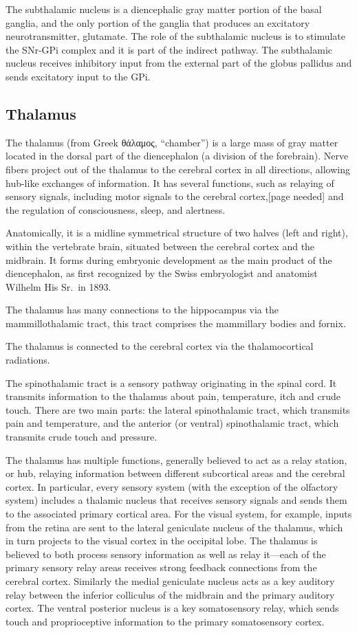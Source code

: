 The subthalamic nucleus is a diencephalic gray matter portion of the basal ganglia, and the only portion of the ganglia that produces an excitatory neurotransmitter, glutamate. The role of the subthalamic nucleus is to stimulate the SNr-GPi complex and it is part of the indirect pathway. The subthalamic nucleus receives inhibitory input from the external part of the globus pallidus and sends excitatory input to the GPi.

\hypertarget{thalamus}{%
\subsection{Thalamus}\label{thalamus}}

The thalamus (from Greek θάλαμος, ``chamber'') is a large mass of gray matter located in the dorsal part of the diencephalon (a division of the forebrain). Nerve fibers project out of the thalamus to the cerebral cortex in all directions, allowing hub-like exchanges of information. It has several functions, such as relaying of sensory signals, including motor signals to the cerebral cortex,{[}page needed{]} and the regulation of consciousness, sleep, and alertness.

Anatomically, it is a midline symmetrical structure of two halves (left and right), within the vertebrate brain, situated between the cerebral cortex and the midbrain. It forms during embryonic development as the main product of the diencephalon, as first recognized by the Swiss embryologist and anatomist Wilhelm His Sr.~in 1893.

The thalamus has many connections to the hippocampus via the mammillothalamic tract, this tract comprises the mammillary bodies and fornix.

The thalamus is connected to the cerebral cortex via the thalamocortical radiations.

The spinothalamic tract is a sensory pathway originating in the spinal cord. It transmits information to the thalamus about pain, temperature, itch and crude touch. There are two main parts: the lateral spinothalamic tract, which transmits pain and temperature, and the anterior (or ventral) spinothalamic tract, which transmits crude touch and pressure.

The thalamus has multiple functions, generally believed to act as a relay station, or hub, relaying information between different subcortical areas and the cerebral cortex. In particular, every sensory system (with the exception of the olfactory system) includes a thalamic nucleus that receives sensory signals and sends them to the associated primary cortical area. For the visual system, for example, inputs from the retina are sent to the lateral geniculate nucleus of the thalamus, which in turn projects to the visual cortex in the occipital lobe. The thalamus is believed to both process sensory information as well as relay it---each of the primary sensory relay areas receives strong feedback connections from the cerebral cortex. Similarly the medial geniculate nucleus acts as a key auditory relay between the inferior colliculus of the midbrain and the primary auditory cortex. The ventral posterior nucleus is a key somatosensory relay, which sends touch and proprioceptive information to the primary somatosensory cortex.

